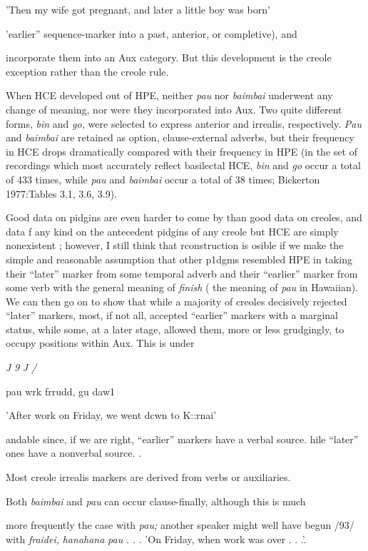 'Then my wife got pregnant, and later a little boy was born'


'earlier'' sequence-marker into a past, anterior, or completive), and

incorporate them into an Aux category. But this development is the creole exception rather than the creole rule.

When HCE developed out of HPE, neither \textit{pau} nor \textit{baimbai} underwent any change of meaning, nor were they incorporated into Aux. Two quite different forms, \textit{bin }and \textit{go,} were selected to express anterior and irrealis, respectively. \textit{Pau} and \textit{baimbai} are retained as option, clause-external adverbs, but their frequency in HCE drops dramatically compared with their frequency in HPE (in the set of recordings which most accurately reflect basilectal HCE, \textit{bin} and \textit{go}
occur a total of 433 times, while \textit{pau }and \textit{baimbai} occur a total of 38 times; Bickerton 1977:Tables 3.1, 3.6, 3.9).

Good data on pidgins are even harder to come by than good data on creoles, and data f any kind on the antecedent pidgins of any creole but HCE are simply nonexistent ; however, I still think that rconstruction is osible if we make the simple and reasonable assump\-tion that other p1dgms resembled HPE in taking their ``later'' marker from some temporal adverb and their ``earlier'' marker from some verb with the general meaning of \textit{finish }( the meaning of \textit{pau} in Hawaiian). We can then go on to show that while a majority of creoles decisively rejected ``later'' markers, most, if not all, accepted ``earlier'' markers with a marginal status, while some, at a later stage, allowed them, more or less grudgingly, to occupy positions within Aux. This is under\-

\textit{J} \textit{9} \textit{J} \textit{/}

pau wrk frrudd, gu daw1

'After work on Friday, we went dcwn to K::rnai'

andable since, if we are right, ``earlier'' markers have a verbal source. hile ``later'' ones have a nonverbal source. .

Most creole irrealis markers are derived from verbs or auxiliaries.

Both \textit{baimbai }and \textit{pau }can occur clause-finally, although this is much

more frequently the case with \textit{pau;} another speaker might well have begun /93/ with \textit{fraidei,} \textit{hanahana} \textit{pau} \textit{.} \textit{.} . 'On Friday, when work was over . . .'.

